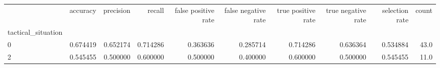 \begin{tabular}{lrrrrrrrrr}
\toprule
{} &  accuracy &  precision &    recall &  false positive rate &  false negative rate &  true positive rate &  true negative rate &  selection rate &  count \\
tactical\_situation &           &            &           &                      &                      &                     &                     &                 &        \\
\midrule
0                  &  0.674419 &   0.652174 &  0.714286 &             0.363636 &             0.285714 &            0.714286 &            0.636364 &        0.534884 &   43.0 \\
2                  &  0.545455 &   0.500000 &  0.600000 &             0.500000 &             0.400000 &            0.600000 &            0.500000 &        0.545455 &   11.0 \\
\bottomrule
\end{tabular}
